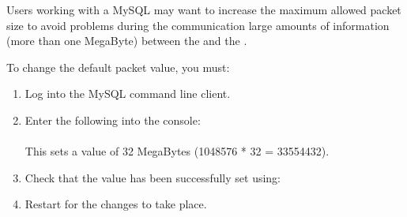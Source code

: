 Users working with a MySQL \gddb{} may want to increase the maximum allowed packet size to avoid problems during the communication large amounts of information (more than one MegaByte) between the \gdagent{} and the \ite{}.

To change the default packet value, you must:

\begin{enumerate}
\item Log into the MySQL command line client.
\item Enter the following into the console:\\
\\
This sets a value of 32  MegaBytes (1048576 * 32 = 33554432).
\item Check that the value has been successfully set using:\\
\item Restart \app{} for the changes to take place.
\end{enumerate}
